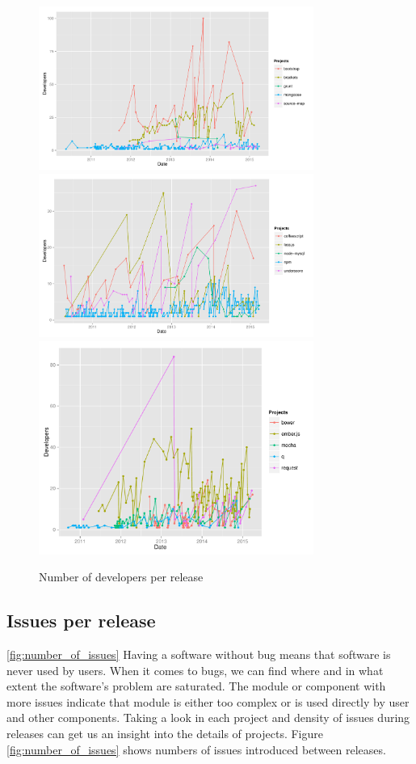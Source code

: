 \begin{figure}[thb!]
	\caption{Number of developers per release}
	\label{fig:number_of_developers}
	\includegraphics[width=90mm,scale=0.5]{figures/number_of_developers}
	\includegraphics[width=90mm,scale=0.5]{figures/number_of_developers_2}
		\includegraphics[width=90mm,scale=0.5]{figures/number_of_developers_3}
\end{figure}

\subsection{Issues per release}


\ref{fig:number_of_issues}
Having a software without bug means that software is never used by users. When it comes to bugs, we can find where and in what extent the software's problem are saturated. The module or component with more issues indicate that module is either too complex or is used directly by user and other components. Taking a look in each project and density of issues during releases can get us an insight into the details of projects. Figure \ref{fig:number_of_issues} shows numbers of issues introduced between releases.

